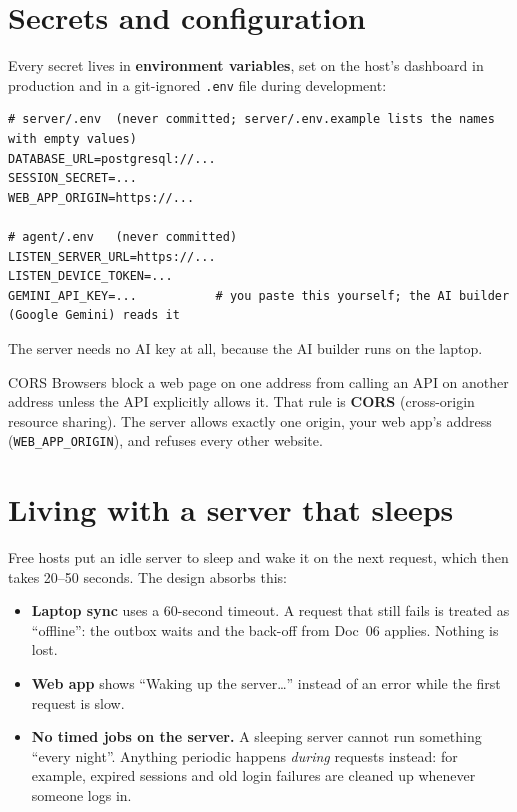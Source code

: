 \documentclass[11pt,a4paper]{article}
\begin{document}
\section{Secrets and configuration}
Every secret lives in \textbf{environment variables}, set on the host's dashboard in production
and in a git-ignored \texttt{.env} file during development:
\begin{lstlisting}
# server/.env  (never committed; server/.env.example lists the names with empty values)
DATABASE_URL=postgresql://...
SESSION_SECRET=...
WEB_APP_ORIGIN=https://...

# agent/.env   (never committed)
LISTEN_SERVER_URL=https://...
LISTEN_DEVICE_TOKEN=...
GEMINI_API_KEY=...           # you paste this yourself; the AI builder (Google Gemini) reads it
\end{lstlisting}
\noindent The server needs no AI key at all, because the AI builder runs on the laptop.

\begin{concept}{CORS}
Browsers block a web page on one address from calling an API on another address unless the API
explicitly allows it. That rule is \textbf{CORS} (cross-origin resource sharing). The server
allows exactly one origin, your web app's address (\texttt{WEB\_APP\_ORIGIN}), and refuses every
other website.
\end{concept}

\section{Living with a server that sleeps}

Free hosts put an idle server to sleep and wake it on the next request, which then takes 20--50
seconds. The design absorbs this:
\begin{itemize}[nosep]
  \item \textbf{Laptop sync} uses a 60-second timeout. A request that still fails is treated as
        ``offline'': the outbox waits and the back-off from Doc~06 applies. Nothing is lost.
  \item \textbf{Web app} shows ``Waking up the server\ldots'' instead of an error while the first
        request is slow.
  \item \textbf{No timed jobs on the server.} A sleeping server cannot run something ``every
        night''. Anything periodic happens \emph{during} requests instead: for example, expired
        sessions and old login failures are cleaned up whenever someone logs in.
\end{itemize}
\end{document}
